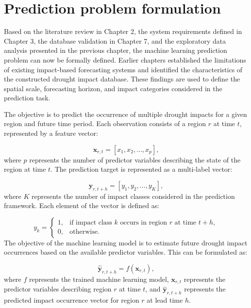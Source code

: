 \section{Prediction problem formulation}

Based on the literature review in Chapter 2, the system requirements defined in Chapter 3, the database validation in Chapter 7, and the exploratory data analysis presented in the previous chapter, the machine learning prediction problem can now be formally defined. Earlier chapters established the limitations of existing impact-based forecasting systems and identified the characteristics of the constructed drought impact database. These findings are used to define the spatial scale, forecasting horizon, and impact categories considered in the prediction task.

The objective is to predict the occurrence of multiple drought impacts for a given region and future time period. Each observation consists of a region $r$ at time $t$, represented by a feature vector:

\begin{equation}
\mathbf{x}_{r,t} =
[x_1,x_2,\ldots,x_p],
\end{equation} where $p$ represents the number of predictor variables describing the state of the region at time $t$. The prediction target is represented as a multi-label vector:

\begin{equation}
\mathbf{y}_{r,t+h} =
[y_1,y_2,\ldots,y_K],
\end{equation} where $K$ represents the number of impact classes considered in the prediction framework. Each element of the vector is defined as:

\begin{equation}
y_k =
\begin{cases}
1, & \text{if impact class } k \text{ occurs in region } r \text{ at time } t+h,\\
0, & \text{otherwise.}
\end{cases}
\end{equation} The objective of the machine learning model is to estimate future drought impact occurrences based on the available predictor variables. This can be formulated as:

\begin{equation}
\hat{\mathbf{y}}_{r,t+h}=f(\mathbf{x}_{r,t}),
\end{equation} where $f$ represents the trained machine learning model, $\mathbf{x}_{r,t}$ represents the predictor variables describing region $r$ at time $t$, and $\hat{\mathbf{y}}_{r,t+h}$ represents the predicted impact occurrence vector for region $r$ at lead time $h$.



